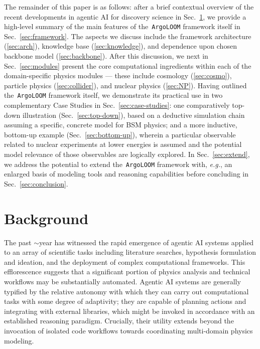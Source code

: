 \documentclass[final,3p,times,sort,compress]{elsarticle}
\newcommand{\AL}{\texttt{ArgoLOOM}\xspace}
\begin{document}
The remainder of this paper is as follows: after a brief contextual overview of the recent
developments in agentic AI for discovery science in Sec.~\ref{sec:background}, we provide
a high-level summary of the main features of the~\AL framework itself in Sec.~\ref{sec:framework}.
%
The aspects we discuss include the framework architecture (\ref{sec:arch}), knowledge base (\ref{sec:knowledge}),
and dependence upon chosen backbone model (\ref{sec:backbone}). After this discussion, we
next in Sec.~\ref{sec:modules} present the core computational ingredients within each of the domain-specific physics modules ---
these include cosmology (\ref{sec:cosmo}), particle physics (\ref{sec:collider}), and nuclear physics (\ref{sec:NP}).
%
Having outlined the~\AL framework itself, we demonstrate its practical use in two complementary
Case Studies in Sec.~\ref{sec:case-studies}: one comparatively top-down illustration (Sec.~\ref{sec:top-down}),
based on a deductive simulation chain assuming a specific, concrete model for BSM physics;
and a more inductive, bottom-up example (Sec.~\ref{sec:bottom-up}), wherein a particular
observable related to nuclear experiments at lower energies is assumed and the potential
model relevance of those observables are logically explored.
%
In Sec.~\ref{sec:extend}, we address the potential to extend the~\AL framework with, {\it e.g.},
an enlarged basis of modeling tools and reasoning capabilities before concluding
in Sec.~\ref{sec:conclusion}.
%

%
%

\section{Background}
\label{sec:background}
%
%
The past $\sim$year has witnessed the rapid emergence of agentic AI
systems applied to an array of scientific tasks including
literature searches, hypothesis formulation and ideation, and the
deployment of complex computational frameworks.
%
This efflorescence suggests that a significant portion
of physics analysis and technical workflows may be substantially automated.
%
Agentic AI systems are generally typified by the relative autonomy with which
they can carry out computational tasks with some degree of adaptivity; they
are capable of planning actions and integrating with external libraries, which
might be invoked in accordance with an established reasoning paradigm.
%
Crucially, their utility extends beyond the invocation of isolated code workflows towards coordinating multi-domain physics modeling.
\end{document}
